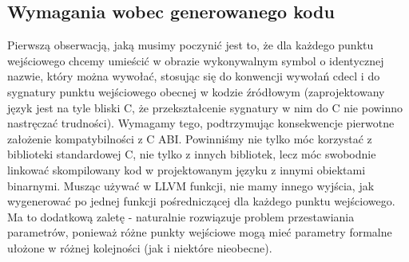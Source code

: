 \subsection{Wymagania wobec generowanego kodu}
Pierwszą obserwacją, jaką musimy poczynić jest to, że dla każdego punktu wejściowego chcemy umieścić w obrazie wykonywalnym symbol o identycznej nazwie, który można wywołać, stosując się do konwencji wywołań cdecl i do sygnatury punktu wejściowego obecnej w kodzie źródłowym (zaprojektowany język jest na tyle bliski C, że przekształcenie sygnatury w nim do C nie powinno nastręczać trudności). Wymagamy tego, podtrzymując konsekwencje pierwotne założenie kompatybilności z C ABI. Powinniśmy nie tylko móc korzystać z biblioteki standardowej C, nie tylko z innych bibliotek, lecz móc swobodnie linkować skompilowany kod w projektowanym języku z innymi obiektami binarnymi. Musząc używać w LLVM funkcji, nie mamy innego wyjścia, jak wygenerować po jednej funkcji pośredniczącej dla każdego punktu wejściowego. Ma to dodatkową zaletę - naturalnie rozwiązuje problem przestawiania parametrów, ponieważ różne punkty wejściowe mogą mieć parametry formalne ułożone w różnej kolejności (jak i niektóre nieobecne).

